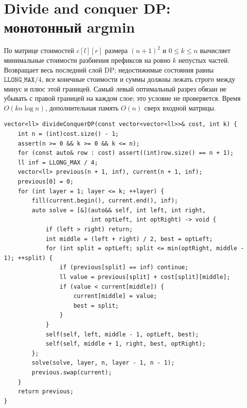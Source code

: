 \section{Divide and conquer DP: монотонный argmin}
По матрице стоимостей $c[l][r]$ размера $(n+1)^2$ и $0\le k\le n$ вычисляет минимальные стоимости разбиения префиксов на ровно $k$ непустых частей.
Возвращает весь последний слой DP; недостижимые состояния равны $\texttt{LLONG\_MAX}/4$, все конечные стоимости и суммы должны лежать строго между минус и плюс этой границей.
Самый левый оптимальный разрез обязан не убывать с правой границей на каждом слое; это условие не проверяется.
Время $O(kn\log n)$, дополнительная память $O(n)$ сверх входной матрицы.
\begin{lstlisting}[name=optimization_dc]
vector<ll> divideConquerDP(const vector<vector<ll>>& cost, int k) {
    int n = (int)cost.size() - 1;
    assert(n >= 0 && k >= 0 && k <= n);
    for (const auto& row : cost) assert((int)row.size() == n + 1);
    ll inf = LLONG_MAX / 4;
    vector<ll> previous(n + 1, inf), current(n + 1, inf);
    previous[0] = 0;
    for (int layer = 1; layer <= k; ++layer) {
        fill(current.begin(), current.end(), inf);
        auto solve = [&](auto&& self, int left, int right,
                         int optLeft, int optRight) -> void {
            if (left > right) return;
            int middle = (left + right) / 2, best = optLeft;
            for (int split = optLeft; split <= min(optRight, middle - 1); ++split) {
                if (previous[split] == inf) continue;
                ll value = previous[split] + cost[split][middle];
                if (value < current[middle]) {
                    current[middle] = value;
                    best = split;
                }
            }
            self(self, left, middle - 1, optLeft, best);
            self(self, middle + 1, right, best, optRight);
        };
        solve(solve, layer, n, layer - 1, n - 1);
        previous.swap(current);
    }
    return previous;
}
\end{lstlisting}
%


